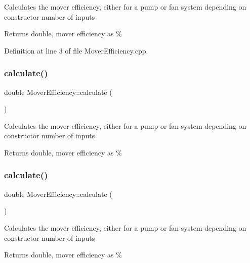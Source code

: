 Calculates the mover efficiency, either for a pump or fan system depending on constructor number of inputs \begin{DoxyReturn}{Returns}
double, mover efficiency as \% 
\end{DoxyReturn}


Definition at line 3 of file Mover\+Efficiency.\+cpp.

\mbox{\label{class_mover_efficiency_ae7b997f1e2fcff1d4263e9921c1a8d9b}} 
\subsubsection{\texorpdfstring{calculate()}{calculate()}\hspace{0.1cm}{\footnotesize\ttfamily [2/3]}}
{\footnotesize\ttfamily double Mover\+Efficiency\+::calculate (\begin{DoxyParamCaption}{ }\end{DoxyParamCaption})}

Calculates the mover efficiency, either for a pump or fan system depending on constructor number of inputs \begin{DoxyReturn}{Returns}
double, mover efficiency as \% 
\end{DoxyReturn}
\mbox{\label{class_mover_efficiency_ae7b997f1e2fcff1d4263e9921c1a8d9b}} 
\subsubsection{\texorpdfstring{calculate()}{calculate()}\hspace{0.1cm}{\footnotesize\ttfamily [3/3]}}
{\footnotesize\ttfamily double Mover\+Efficiency\+::calculate (\begin{DoxyParamCaption}{ }\end{DoxyParamCaption})}

Calculates the mover efficiency, either for a pump or fan system depending on constructor number of inputs \begin{DoxyReturn}{Returns}
double, mover efficiency as \% 
\end{DoxyReturn}
\mbox{\label{class_mover_efficiency_a3b0d468a68703127624ab996f03d2368}} 

